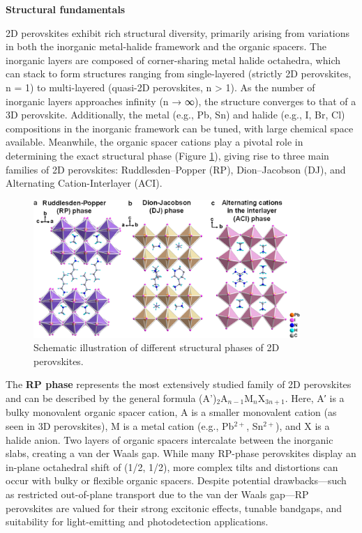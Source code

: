 \textbf{Structural fundamentals}

2D perovskites exhibit rich structural diversity, primarily arising from variations in both the inorganic metal-halide framework and the organic spacers\cite{RN394}. The inorganic layers are composed of corner-sharing metal halide octahedra, which can stack to form structures ranging from single-layered (strictly 2D perovskites, n = 1) to multi-layered (quasi-2D perovskites, n > 1)\cite{RN140}. As the number of inorganic layers approaches infinity (n → ∞), the structure converges to that of a 3D perovskite. Additionally, the metal (e.g., Pb, Sn) and halide (e.g., I, Br, Cl) compositions in the inorganic framework can be tuned, with large chemical space available\cite{RN102}. Meanwhile, the organic spacer cations play a pivotal role in determining the exact structural phase (Figure \ref{fig:figure2.10}), giving rise to three main families of 2D perovskites: Ruddlesden–Popper (RP), Dion–Jacobson (DJ), and Alternating Cation-Interlayer (ACI).

\begin{figure}[ht]
    \centering
    \includegraphics[width=0.9\textwidth]{figures/literature-review/figure2-10.png}
    \caption{Schematic illustration of different structural phases of 2D perovskites\cite{RN144}.}
    \label{fig:figure2.10}
\end{figure}

The \textbf{RP phase} represents the most extensively studied family of 2D perovskites and can be described by the general formula (A’)$_2$A$_{n-1}$M$_n$X$_{3n+1}$. Here, A′ is a bulky monovalent organic spacer cation, A is a smaller monovalent cation (as seen in 3D perovskites), M is a metal cation (e.g., Pb$^{2+}$, Sn$^{2+}$), and X is a halide anion. Two layers of organic spacers intercalate between the inorganic slabs, creating a van der Waals gap. While many RP-phase perovskites display an in-plane octahedral shift of (1/2, 1/2), more complex tilts and distortions can occur with bulky or flexible organic spacers. Despite potential drawbacks—such as restricted out-of-plane transport due to the van der Waals gap—RP perovskites are valued for their strong excitonic effects, tunable bandgaps, and suitability for light-emitting and photodetection applications\cite{RN108,RN190}.

